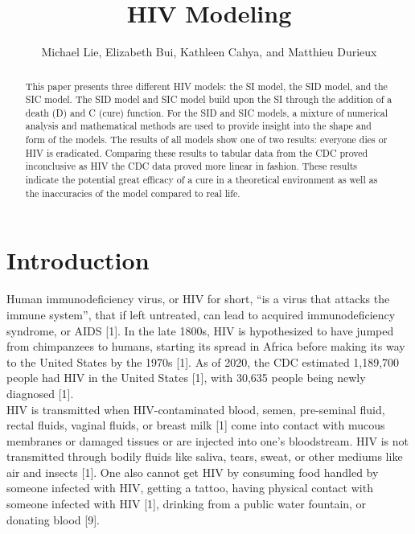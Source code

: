 \documentclass[a4paper, final, 12pt]{article}
\numberwithin{equation}{section}
\begin{document}
\title{HIV Modeling}
\author{Michael Lie, Elizabeth Bui, Kathleen Cahya, and Matthieu Durieux}
\maketitle
\begin{abstract}
This paper presents three different HIV models: the SI model, the SID model, and the SIC model. The SID model and SIC model build upon the SI through the addition of a death (D) and C (cure) function. For the SID and SIC models, a mixture of numerical analysis and mathematical methods are used to provide insight into the shape and form of the models. The results of all models show one of two results: everyone dies or HIV is eradicated. Comparing these results to tabular data from the CDC proved inconclusive as HIV the CDC data proved more linear in fashion. These results indicate the potential great efficacy of a cure in a theoretical environment as well as the inaccuracies of the model compared to real life. 

\end{abstract}
\section{Introduction}\label{sec:Introduction}
\hspace{22pt} Human immunodeficiency virus, or HIV for short, “is a virus that attacks the immune system”, that if left untreated, can lead to acquired immunodeficiency syndrome, or AIDS [1]. In the late 1800s, HIV is hypothesized to have jumped from chimpanzees to humans, starting its spread in Africa before making its way to the United States by the 1970s [1]. As of 2020, the CDC estimated 1,189,700 people had HIV in the United States [1], with 30,635 people being newly diagnosed [1]. \\

HIV is transmitted when HIV-contaminated blood, semen, pre-seminal fluid, rectal fluids, vaginal fluids, or breast milk [1] come into contact with mucous membranes or damaged tissues or are injected into one's bloodstream. HIV is not transmitted through bodily fluids like saliva, tears, sweat, or other mediums like air and insects [1]. One also cannot get HIV by consuming food handled by someone infected with HIV, getting a tattoo, having physical contact with someone infected with HIV [1], drinking from a public water fountain, or donating blood [9].\\
\end{document}
